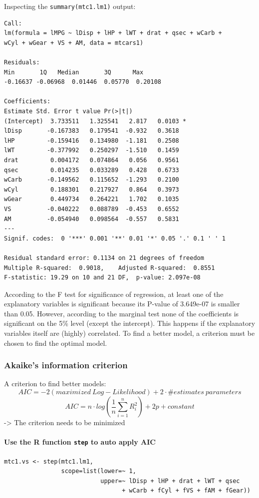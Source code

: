 Inspecting the \lstinline{summary(mtc1.lm1)} output:
\begin{lstlisting}
Call:
lm(formula = lMPG ~ lDisp + lHP + lWT + drat + qsec + wCarb + 
wCyl + wGear + VS + AM, data = mtcars1)

Residuals:
Min       1Q   Median       3Q      Max 
-0.16637 -0.06968  0.01446  0.05770  0.20108 

Coefficients:
Estimate Std. Error t value Pr(>|t|)  
(Intercept)  3.733511   1.325541   2.817   0.0103 *
lDisp       -0.167383   0.179541  -0.932   0.3618  
lHP         -0.159416   0.134980  -1.181   0.2508  
lWT         -0.377992   0.250297  -1.510   0.1459  
drat         0.004172   0.074864   0.056   0.9561  
qsec         0.014235   0.033289   0.428   0.6733  
wCarb       -0.149562   0.115652  -1.293   0.2100  
wCyl         0.188301   0.217927   0.864   0.3973  
wGear        0.449734   0.264221   1.702   0.1035  
VS          -0.040222   0.088789  -0.453   0.6552  
AM          -0.054940   0.098564  -0.557   0.5831  
---
Signif. codes:  0 '***' 0.001 '**' 0.01 '*' 0.05 '.' 0.1 ' ' 1

Residual standard error: 0.1134 on 21 degrees of freedom
Multiple R-squared:  0.9018,	Adjusted R-squared:  0.8551 
F-statistic: 19.29 on 10 and 21 DF,  p-value: 2.097e-08
\end{lstlisting}

According to the F test for significance of regression, at least one of the explanatory variables is significant because its P-value of 3.649e-07 is smaller than 0.05. However, according to the marginal test none of the coefficients is significant on the 5\% level (except the intercept). This happens if the explanatory variables itself are (highly) correlated. To find a better model, a criterion must be chosen to find the optimal model.

\subsubsection{Akaike's information criterion}
A criterion to find better models:
\begin{equation*}
AIC = -2(maximized \: Log-Likelihood) + 2 \cdot \#estimates\: parameters
\end{equation*}
\begin{equation*}
AIC = n\cdot log(\frac{1}{n}\sum_{i=1}^{n} R_i^2) + 2p + constant
\end{equation*}
-> The criterion needs to be minimized

\paragraph{Use the R function \lstinline{step} to auto apply AIC}
\mbox{}
\begin{lstlisting}
mtc1.vs <- step(mtc1.lm1,
                scope=list(lower=~ 1,
                           upper=~ lDisp + lHP + drat + lWT + qsec
                                 + wCarb + fCyl + fVS + fAM + fGear))
\end{lstlisting}

